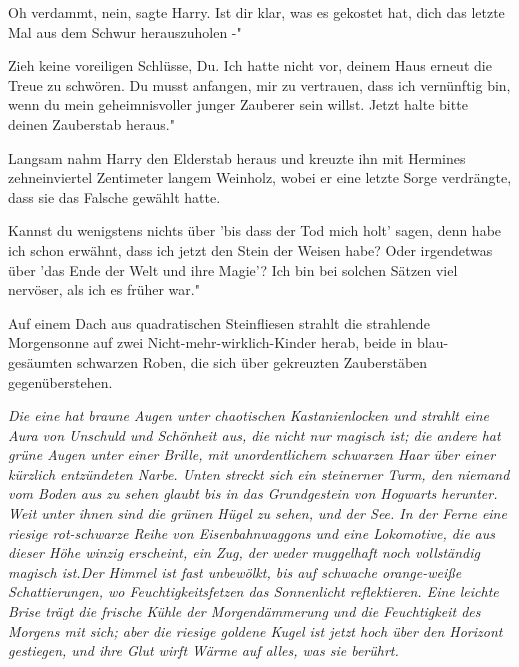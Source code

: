 \glqq{}Oh verdammt, nein\grqq{}, sagte Harry. \glqq{}Ist dir klar, was es gekostet
hat, dich das letzte Mal aus dem Schwur herauszuholen -"

\glqq{}Zieh keine voreiligen Schlüsse, Du. Ich hatte nicht vor, deinem Haus
erneut die Treue zu schwören. Du musst anfangen, mir zu vertrauen, dass ich
vernünftig bin, wenn du mein geheimnisvoller junger Zauberer sein willst. Jetzt
halte bitte deinen Zauberstab heraus."

Langsam nahm Harry den Elderstab heraus und kreuzte ihn mit Hermines
zehneinviertel Zentimeter langem Weinholz, wobei er eine letzte Sorge
verdrängte, dass sie das Falsche gewählt hatte.

\glqq{}Kannst du wenigstens nichts über 'bis dass der Tod mich holt' sagen, denn
habe ich schon erwähnt, dass ich jetzt den Stein der Weisen habe? Oder
irgendetwas über 'das Ende der Welt und ihre Magie'? Ich bin bei solchen Sätzen
viel nervöser, als ich es früher war."

Auf einem Dach aus quadratischen Steinfliesen strahlt die strahlende Morgensonne
auf zwei Nicht-mehr-wirklich-Kinder herab, beide in blau-gesäumten schwarzen
Roben, die sich über gekreuzten Zauberstäben gegenüberstehen.

\emph{Die eine hat braune Augen unter chaotischen Kastanienlocken und strahlt
eine Aura von Unschuld und Schönheit aus, die nicht nur magisch ist; die andere
hat grüne Augen unter einer Brille, mit unordentlichem schwarzen Haar über einer
kürzlich entzündeten Narbe. Unten streckt sich ein steinerner Turm, den niemand
vom Boden aus zu sehen glaubt bis in das Grundgestein von Hogwarts herunter.
Weit unter ihnen sind die grünen Hügel zu sehen, und der See. In der Ferne eine
riesige rot-schwarze Reihe von Eisenbahnwaggons und eine Lokomotive, die aus
dieser Höhe winzig erscheint, ein Zug, der weder muggelhaft noch vollständig
magisch ist.Der Himmel ist fast unbewölkt, bis auf schwache orange-weiße
Schattierungen, wo Feuchtigkeitsfetzen das Sonnenlicht reflektieren. Eine
leichte Brise trägt die frische Kühle der Morgendämmerung und die Feuchtigkeit
des Morgens mit sich; aber die riesige goldene Kugel ist jetzt hoch über den
Horizont gestiegen, und ihre Glut wirft Wärme auf alles, was sie berührt.}

